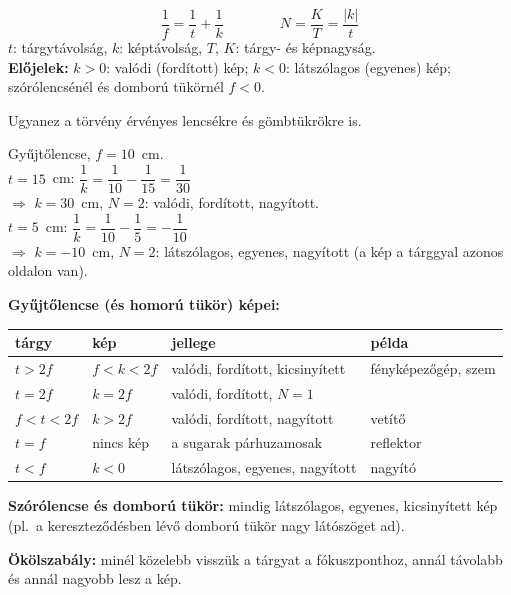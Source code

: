 \documentclass[12pt]{article}
\begin{document}
\begin{minipage}[t]{0.42\linewidth}\vspace{0pt}
\begin{fontos}
\[ \frac1f = \frac1t + \frac1k \qquad\qquad N = \frac{K}{T} = \frac{|k|}{t} \]
$t$: tárgytávolság, $k$: képtávolság, $T$, $K$: tárgy- és képnagyság.\\[2pt]
\textbf{Előjelek:} $k > 0$: valódi (fordított) kép; $k < 0$: látszólagos (egyenes) kép;
szórólencsénél és domború tükörnél $f < 0$.
\end{fontos}
Ugyanez a törvény érvényes lencsékre és gömbtükrökre is.
\begin{pelda}
Gyűjtőlencse, $f = 10$~cm.\\[2pt]
$t = 15$~cm: \quad $\dfrac1k = \dfrac1{10} - \dfrac1{15} = \dfrac1{30}$\\[2pt]
$\Rightarrow$ $k = 30$~cm, $N = 2$: valódi, fordított, nagyított.\\[4pt]
$t = 5$~cm: \quad $\dfrac1k = \dfrac1{10} - \dfrac15 = -\dfrac1{10}$\\[2pt]
$\Rightarrow$ $k = -10$~cm, $N = 2$: látszólagos, egyenes, nagyított
(a kép a tárggyal azonos oldalon van).
\end{pelda}
\end{minipage}\hfill
\begin{minipage}[t]{0.555\linewidth}\vspace{0pt}
\textbf{Gyűjtőlencse (és homorú tükör) képei:}\\[4pt]
\renewcommand{\arraystretch}{1.35}
\small\setlength{\tabcolsep}{4pt}
\begin{tabular}{|l|l|p{4.3cm}|p{2.6cm}|}
\hline
\textbf{tárgy} & \textbf{kép} & \textbf{jellege} & \textbf{példa} \\ \hline
$t > 2f$ & $f < k < 2f$ & valódi, fordított, kicsinyített & fényképezőgép, szem \\ \hline
$t = 2f$ & $k = 2f$ & valódi, fordított, $N = 1$ & \\ \hline
$f < t < 2f$ & $k > 2f$ & valódi, fordított, nagyított & vetítő \\ \hline
$t = f$ & nincs kép & a sugarak párhuzamosak & reflektor \\ \hline
$t < f$ & $k < 0$ & látszólagos, egyenes, nagyított & nagyító \\ \hline
\end{tabular}

\vspace{8pt}
\normalsize
\textbf{Szórólencse és domború tükör:} mindig látszólagos, egyenes, kicsinyített kép
(pl.\ a kereszteződésben lévő domború tükör nagy látószöget ad).

\vspace{6pt}
\textbf{Ökölszabály:} minél közelebb visszük a tárgyat a fókuszponthoz, annál távolabb és
annál nagyobb lesz a kép.
\end{minipage}
\end{document}

